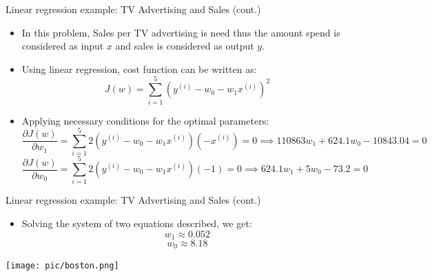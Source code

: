 \documentclass[serif, aspectratio=169]{beamer}
\begin{document}
    \begin{frame}{Linear regression example: TV Advertising and Sales (cont.)}
        \begin{itemize}
            \item In this problem, Sales per TV advertising is need thus the amount spend is considered as input \( x \) and sales is considered as output \( y \).
            \item Using linear regression, cost function can be written as:
            \[
                J(w) = \sum_{i=1}^{5} \left( y^{(i)} - w_0 - w_1 x^{(i)} \right)^2
            \]
            \item Applying necessary conditions for the optimal parameters:
            \[
                \frac{\partial J(w)}{\partial w_1} = \sum_{i=1}^{5} 2 \left( y^{(i)} - w_0 - w_1 x^{(i)} \right) (-x^{(i)}) = 0 \implies 110863 w_1 + 624.1 w_0 - 10843.04 = 0
            \]
            \[
                \frac{\partial J(w)}{\partial w_0} = \sum_{i=1}^{5} 2 \left( y^{(i)} - w_0 - w_1 x^{(i)} \right) (-1) = 0 \implies 624.1 w_1 + 5 w_0 - 73.2 = 0
            \]
        \end{itemize}
    \end{frame}





    \begin{frame}{Linear regression example: TV Advertising and Sales (cont.)}
        \begin{minipage}{0.4\textwidth}
            \begin{itemize}
                \item Solving the system of two equations described, we get:
                \[ w_1 \approx 0.052 \]
                \[ w_0 \approx 8.18 \]
            \end{itemize}
        \end{minipage}%
        \begin{minipage}{0.55\textwidth}
            \centering
            \texttt{[image: pic/boston.png]}
        \end{minipage}

    \end{frame}
\end{document}
